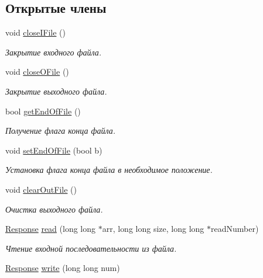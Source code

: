 \subsection*{Открытые члены}
\begin{DoxyCompactItemize}
\item 
void \hyperlink{class_file_manager_a4a4719a410ca31985e8b75ad75485ce6}{close\+I\+File} ()
\begin{DoxyCompactList}\small\item\em Закрытие входного файла. \end{DoxyCompactList}\item 
void \hyperlink{class_file_manager_a6a1f1ddbf047fc7e9531f483e4c62148}{close\+O\+File} ()
\begin{DoxyCompactList}\small\item\em Закрытие выходного файла. \end{DoxyCompactList}\item 
bool \hyperlink{class_file_manager_a49df99509ff2700e0e5edd06adca345c}{get\+End\+Of\+File} ()
\begin{DoxyCompactList}\small\item\em Получение флага конца файла. \end{DoxyCompactList}\item 
void \hyperlink{class_file_manager_ace8ce2677414831b5a9e7030248fc832}{set\+End\+Of\+File} (bool b)
\begin{DoxyCompactList}\small\item\em Установка флага конца файла в необходимое положение. \end{DoxyCompactList}\item 
void \hyperlink{class_file_manager_a2f1102abfd0a5a9d7e178968a3fdc56c}{clear\+Out\+File} ()
\begin{DoxyCompactList}\small\item\em Очистка выходного файла. \end{DoxyCompactList}\item 
\hyperlink{_structures_8h_ab3500e5d3c915d1b5cc58dcab8673fd4}{Response} \hyperlink{class_file_manager_a66fd5270bbc2bd37151c59a713a10abf}{read} (long long $\ast$arr, long long size, long long $\ast$read\+Number)
\begin{DoxyCompactList}\small\item\em Чтение входной последовательности из файла. \end{DoxyCompactList}\item 
\hyperlink{_structures_8h_ab3500e5d3c915d1b5cc58dcab8673fd4}{Response} \hyperlink{class_file_manager_a00ecad8c4cdb3fd24d0199379c604947}{write} (long long num)

\end{DoxyCompactItemize}
